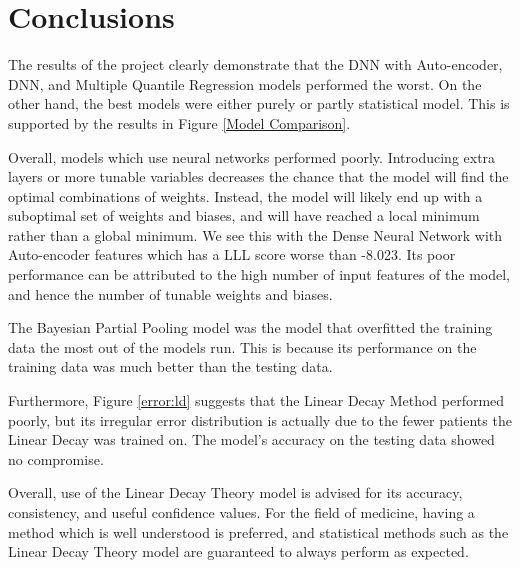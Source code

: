 \documentclass[12pt]{article}
\begin{document}
\section{Conclusions}


The results of the project clearly demonstrate that the DNN with Auto-encoder, DNN, and Multiple Quantile Regression models performed the worst.
On the other hand, the best models were either purely or partly statistical model.
This is supported by the results in Figure \ref{Model Comparison}. 

Overall, models which use neural networks performed poorly.
Introducing extra layers or more tunable variables decreases the chance that the model will find the optimal combinations of weights.
Instead, the model will likely end up with a suboptimal set of weights and biases, and will have reached a local minimum rather than a global minimum.
We see this with the Dense Neural Network with Auto-encoder features which has a LLL score worse than -8.023.
Its poor performance can be attributed to the high number of input features of the model, and hence the number of tunable weights and biases.

The Bayesian Partial Pooling model was the model that overfitted the training data the most out of the models run.
This is because its performance on the training data was much better than the testing data.

Furthermore, Figure \ref{error:ld} suggests that the Linear Decay Method performed poorly, but its irregular error distribution is actually due to the fewer patients the Linear Decay was trained on.
The model's accuracy on the testing data showed no compromise.

Overall, use of the Linear Decay Theory model is advised for its accuracy, consistency, and useful confidence values.
For the field of medicine, having a method which is well understood is preferred, and statistical methods such as the Linear Decay Theory model are guaranteed to always perform as expected.
\end{document}
